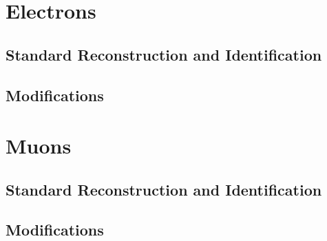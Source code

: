 \section{Electrons}
\label{sec:elecreco}

\subsection{Standard Reconstruction and Identification}
\subsection{Modifications}


\section{Muons}
\label{sec:muonreco}
\subsection{Standard Reconstruction and Identification}
\subsection{Modifications}

